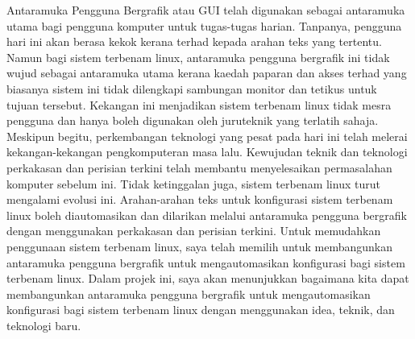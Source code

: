 \begin{abstrak}
Antaramuka Pengguna Bergrafik atau GUI telah digunakan sebagai antaramuka utama bagi pengguna komputer untuk tugas-tugas harian. Tanpanya, pengguna hari ini akan berasa kekok kerana terhad kepada arahan teks yang tertentu. Namun bagi sistem terbenam linux, antaramuka pengguna bergrafik ini tidak wujud sebagai antaramuka utama kerana kaedah paparan dan akses terhad yang biasanya sistem ini tidak dilengkapi sambungan monitor dan tetikus untuk tujuan tersebut. Kekangan ini menjadikan sistem terbenam linux tidak mesra pengguna dan hanya boleh digunakan oleh juruteknik yang terlatih sahaja. Meskipun begitu, perkembangan teknologi yang pesat pada hari ini telah melerai kekangan-kekangan pengkomputeran masa lalu. Kewujudan teknik dan teknologi perkakasan dan perisian terkini telah membantu menyelesaikan permasalahan komputer sebelum ini. Tidak ketinggalan juga, sistem terbenam linux turut mengalami evolusi ini. Arahan-arahan teks untuk konfigurasi sistem terbenam linux boleh diautomasikan dan dilarikan melalui antaramuka pengguna bergrafik dengan menggunakan perkakasan dan perisian terkini. Untuk memudahkan penggunaan sistem terbenam linux, saya telah memilih untuk membangunkan antaramuka pengguna bergrafik untuk mengautomasikan konfigurasi bagi sistem terbenam linux. Dalam projek ini, saya akan menunjukkan bagaimana kita dapat membangunkan antaramuka pengguna bergrafik untuk mengautomasikan konfigurasi bagi sistem terbenam linux dengan menggunakan idea, teknik, dan teknologi baru.
\end{abstrak}
